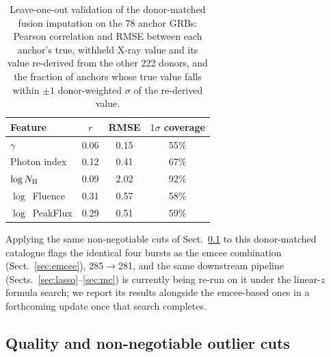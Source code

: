 \documentclass{aa}
\newcommand{\NH}{N_{\rm H}}
\begin{document}
\begin{table}
  \centering
  \caption{Leave-one-out validation of the donor-matched fusion imputation on the
    78 anchor GRBs: Pearson correlation and RMSE between each anchor's true,
    withheld X-ray value and its value re-derived from the other 222 donors, and
    the fraction of anchors whose true value falls within $\pm1$ donor-weighted
    $\sigma$ of the re-derived value.}
  \label{tab:otloo}
  \begin{tabular}{lccc}
    \hline\hline
    Feature & $r$ & RMSE & $1\sigma$ coverage \\
    \hline
    $\gamma$            & 0.06 & 0.15 & 55\% \\
    Photon index        & 0.12 & 0.41 & 67\% \\
    $\log \NH$          & 0.09 & 2.02 & 92\% \\
    $\log$~Fluence      & 0.31 & 0.57 & 58\% \\
    $\log$~PeakFlux     & 0.29 & 0.51 & 59\% \\
    \hline
  \end{tabular}
\end{table}

Applying the same non-negotiable cuts of Sect.~\ref{sec:cuts} to this
donor-matched catalogue flags the identical four bursts as the emcee combination
(Sect.~\ref{sec:emcee}), 285$\rightarrow$281, and the same downstream pipeline
(Sects.~\ref{sec:lasso}--\ref{sec:mc}) is currently being re-run on it under the
linear-$z$ formula search; we report its results alongside the emcee-based ones in
a forthcoming update once that search completes.

\subsection{Quality and non-negotiable outlier cuts}
\label{sec:cuts}
\end{document}
